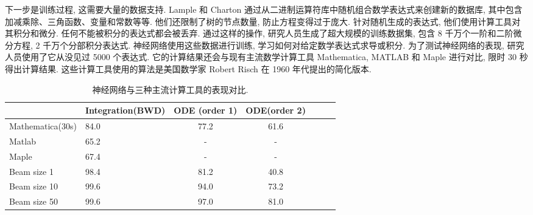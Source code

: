 下一步是训练过程, 这需要大量的数据支持. Lample 和 Charton 通过从二进制运算符库中随机组合数学表达式来创建新的数据库, 其中包含加减乘除、三角函数、变量和常数等等. 他们还限制了树的节点数量, 防止方程变得过于庞大.
针对随机生成的表达式, 他们使用计算工具对其积分和微分. 任何不能被积分的表达式都会被丢弃.
通过这样的操作, 研究人员生成了超大规模的训练数据集, 包含 8 千万个一阶和二阶微分方程, 2 千万个分部积分表达式.
神经网络使用这些数据进行训练, 学习如何对给定数学表达式求导或积分.
为了测试神经网络的表现, 研究人员使用了它从没见过 5000 个表达式. 它的计算结果还会与现有主流数学计算工具 Mathematica, MATLAB 和 Maple 进行对比, 限时 30 秒得出计算结果. 这些计算工具使用的算法是美国数学家 Robert Risch 在 1960 年代提出的简化版本.
\begin{table}[thbp]
\begin{center}
\caption{神经网络与三种主流计算工具的表现对比.}
\begin{tabular}{p{3.05cm}|lccccl}
\toprule
&Integration(BWD)& ODE (order 1) &ODE(order 2)\\
\toprule
Mathematica(30s)&84.0&77.2&61.6\\
Matlab&65.2&-&-\\
Maple&67.4&-&-\\
Beam size 1&98.4&81.2&40.8\\
Beam size 10&99.6&94.0& 73.2\\
Beam size 50&99.6&97.0& 81.0\\
\bottomrule
\end{tabular}
\label{NNODEeq001fig14}
\end{center}
\end{table}

